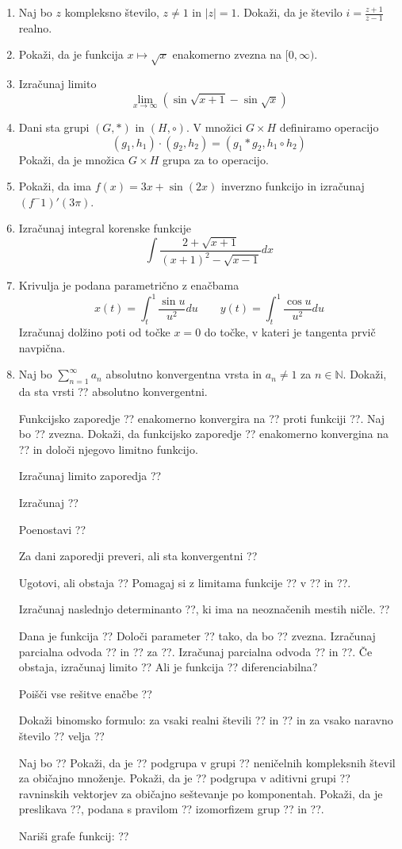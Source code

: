\documentclass[a4paper,12pt]{article}
\begin{document}
\begin{enumerate}
\item Naj bo $z$ kompleksno število, $z\neq1$ in $|z|=1$.
Dokaži, da je število $i=\frac{z+1}{z-1}$ realno.

\item Pokaži, da je funkcija $x\mapsto \sqrt{x}$ enakomerno zvezna na $[0,\infty)$.

\item Izračunaj limito
\[
    \lim_{x\rightarrow\infty}(\sin{\sqrt{x+1}}-\sin{\sqrt{x}})
\]

\item Dani sta grupi $(G,*)$ in $(H,\circ)$. V množici $G \times H$ definiramo operacijo
\[
    (g_1,h_1)\cdot (g_2,h_2)= (g_1*g_2,h_1 \circ h_2)
\]
Pokaži, da je množica $G \times H$ grupa za to operacijo.

\item Pokaži, da ima $f(x)=3x+\sin(2x)$ inverzno funkcijo in izračunaj $(f^-1)'(3\pi)$.

\item Izračunaj integral korenske funkcije
\[
    \int{\frac{2+\sqrt{x+1}}{(x+1)^2 -\sqrt{x-1}}}dx
\]
\item Krivulja je podana parametrično z enačbama
\[
    x(t)=\int_{t}^{1} \frac{\sin u}{u^2}du \qquad y(t)=\int_{t}^{1} \frac{\cos u}{u^2}du 
\]
Izračunaj dolžino poti od točke $x=0$ do točke, v kateri je tangenta prvič navpična.

\item Naj bo $\sum_{n=1}^{\infty}a_n$ absolutno konvergentna vrsta in $a_n\neq 1$ za $n\in \mathbb{N}$.
Dokaži, da sta vrsti
??
absolutno konvergentni.

Funkcijsko zaporedje ?? enakomerno konvergira na ?? proti funkciji ??.
Naj bo ?? zvezna. Dokaži, da funkcijsko zaporedje ??
enakomerno konvergina na ?? in določi njegovo limitno funkcijo.

Izračunaj limito zaporedja
??

Izračunaj
??

Poenostavi
??

Za dani zaporedji preveri, ali sta konvergentni
??

Ugotovi, ali obstaja
??
Pomagaj si z limitama funkcije ?? v ?? in ??.

Izračunaj naslednjo determinanto ??, ki ima na neoznačenih mestih ničle.
??

Dana je funkcija
??
Določi parameter ?? tako, da bo ?? zvezna.
Izračunaj parcialna odvoda ?? in ?? za ??.
Izračunaj parcialna odvoda ?? in ??.
Če obstaja, izračunaj limito
??
Ali je funkcija ?? diferenciabilna?

Poišči vse rešitve enačbe
??

Dokaži binomsko formulo: za vsaki realni števili ?? in ?? in za vsako naravno število ?? velja
??

Naj bo
??
Pokaži, da je ?? podgrupa v grupi ??
neničelnih kompleksnih števil za običajno množenje.
Pokaži, da je ?? podgrupa v aditivni grupi ??
ravninskih vektorjev za običajno seštevanje po komponentah.
Pokaži, da je preslikava ??, podana s pravilom
??
izomorfizem grup ?? in ??.

Nariši grafe funkcij:
??

\end{enumerate}
\end{document}
